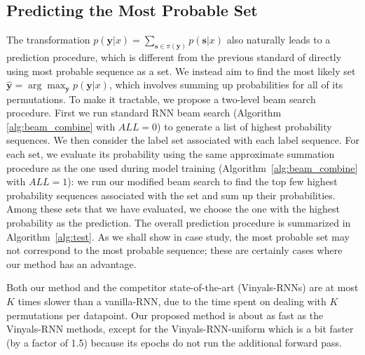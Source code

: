 \subsection{Predicting the Most Probable Set}
The transformation $p(\mathbf{y}|x)=\sum_{\mathbf{s}\in \pi(\mathbf{y})} p(\mathbf{s}|x)$ also naturally leads to a prediction procedure, which is different from the previous standard of directly using most probable sequence as a set. We instead aim to find the most likely set $\hat{\mathbf{y}}=\arg\max_{\mathbf{y}} p(\mathbf{y}|x)$, which involves summing up probabilities for all of its permutations. To make it tractable, we propose a two-level beam search procedure. First we run standard RNN beam search (Algorithm \ref{alg:beam_combine} with $ALL=0$) to generate a list of highest probability sequences. We then consider the label set associated with each label sequence. For each set, we evaluate its probability using the same approximate summation procedure as the one used during model training (Algorithm~\ref{alg:beam_combine} with $ALL=1$): we run our modified beam search to find the top few highest probability sequences associated with the set and sum up their probabilities. Among these sets that we have evaluated, we choose the one with the highest probability as the prediction. The overall prediction procedure is summarized in Algorithm~\ref{alg:test}. As we shall show in case study, the most probable set may not correspond to the most probable sequence; these are certainly cases where our method has an advantage.


Both our method and the competitor state-of-the-art (Vinyals-RNNs) are at most $K$ times slower than a vanilla-RNN,  due to the time spent on dealing with $K$ permutations per datapoint. Our proposed method is about as fast as the Vinyals-RNN methods, except for the Vinyals-RNN-uniform which is a bit faster (by a factor of 1.5) because its epochs do not run the additional forward pass. 

